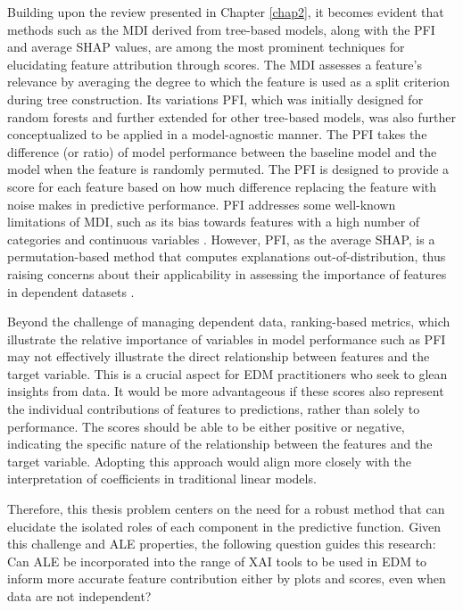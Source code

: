 Building upon the review presented in Chapter \ref{chap2}, it becomes evident that methods such as the \gls{MDI} derived from tree-based models, along with the \gls{PFI} and average \gls{SHAP} values, are among the most prominent techniques for elucidating feature attribution through scores. The \gls{MDI} assesses a feature's relevance by averaging the degree to which the feature is used as a split criterion during tree construction. Its variations \gls{PFI},  which was initially designed for random forests and further extended for other tree-based models, was also further conceptualized to be applied in a model-agnostic manner. The \gls{PFI} takes the difference (or ratio) of model performance between the baseline model and the model when the feature is randomly permuted. The \gls{PFI} is designed to provide a score for each feature based on how much diﬀerence replacing the feature with noise makes in predictive performance. \gls{PFI} addresses some well-known limitations of \gls{MDI}, such as its bias towards features with a high number of categories and continuous variables \cite{Li2019AForests}. However, \gls{PFI}, as the average \gls{SHAP}, is a permutation-based method that computes explanations out-of-distribution, thus raising concerns about their applicability in assessing the importance of features in dependent datasets \cite{Strobl2008ConditionalForests, Rudin2019StopInstead, Nembrini2019BiasRecommendations, Nicodemus2011LetterMeasures}. 

Beyond the challenge of managing dependent data, ranking-based metrics, which illustrate the relative importance of variables in model performance such as \gls{PFI} may not effectively illustrate the direct relationship between features and the target variable. This is a crucial aspect for \gls{EDM} practitioners who seek to glean insights from data. It would be more advantageous if these scores also represent the individual contributions of features to predictions, rather than solely to performance. The scores should be able to be either positive or negative, indicating the specific nature of the relationship between the features and the target variable. Adopting this approach would align more closely with the interpretation of coefficients in traditional linear models.

Therefore, this thesis problem centers on the need for a robust method that can elucidate the isolated roles of each component in the predictive function. Given this challenge and \gls{ALE} properties, the following question guides this research: Can \gls{ALE} be incorporated into the range of \gls{XAI} tools to be used in \gls{EDM} to inform more accurate feature contribution either by plots and scores, even when data are not independent? 






